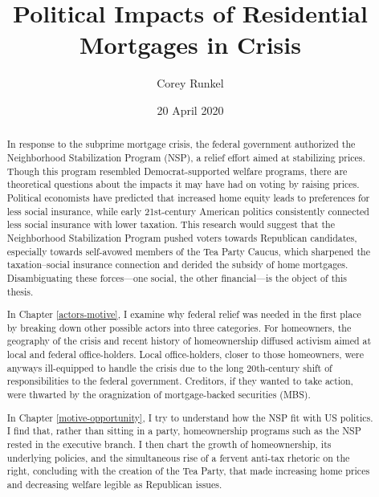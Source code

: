 \documentclass[12pt,oneside]{psthesis}
\title{Political Impacts of Residential Mortgages in Crisis}
\author{Corey Runkel}
\date{20 April 2020}
\begin{document}
  \maketitle

\frontmatter %

  \setcounter{tocdepth}{2}
  \tableofcontents
  \thispagestyle{plain}

  \listoftables
  \thispagestyle{plain}

  \printnomenclature
  \thispagestyle{plain}

  \listoffigures
  \thispagestyle{plain}
  \begin{abstract}
  \thispagestyle{plain}
    In response to the subprime mortgage crisis, the federal government authorized the Neighborhood Stabilization Program (NSP), a relief effort aimed at stabilizing prices.
    Though this program resembled Democrat-supported welfare programs, there are theoretical questions about the impacts it may have had on voting by raising prices.
    Political economists have predicted that increased home equity leads to preferences for less social insurance, while early 21st-century American politics consistently connected less social insurance with lower taxation.
    This research would suggest that the Neighborhood Stabilization Program pushed voters towards Republican candidates, especially towards self-avowed members of the Tea Party Caucus, which sharpened the taxation--social insurance connection and derided the subsidy of home mortgages.
    Disambiguating these forces---one social, the other financial---is the object of this thesis.
    
    In Chapter \ref{actors-motive}, I examine why federal relief was needed in the first place by breaking down other possible actors into three categories.
    For homeowners, the geography of the crisis and recent history of homeownership diffused activism aimed at local and federal office-holders.
    Local office-holders, closer to those homeowners, were anyways ill-equipped to handle the crisis due to the long 20th-century shift of responsibilities to the federal government.
    Creditors, if they wanted to take action, were thwarted by the oragnization of mortgage-backed securities (MBS).
    
    In Chapter \ref{motive-opportunity}, I try to understand how the NSP fit with US politics.
    I find that, rather than sitting in a party, homeownership programs such as the NSP rested in the executive branch.
    I then chart the growth of homeownership, its underlying policies, and the simultaneous rise of a fervent anti-tax rhetoric on the right, concluding with the creation of the Tea Party, that made increasing home prices and decreasing welfare legible as Republican issues.
    

\end{abstract}
\end{document}
